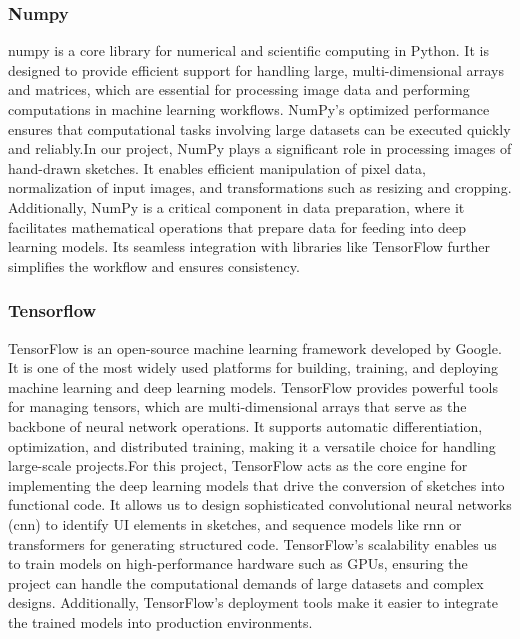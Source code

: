 \subsubsection{Numpy}
\gls{numpy} is a core library for numerical and scientific computing in Python. It is designed to provide efficient support for handling large, multi-dimensional arrays and matrices, which are essential for processing image data and performing computations in machine learning workflows. NumPy's optimized performance ensures that computational tasks involving large datasets can be executed quickly and reliably.In our project, NumPy plays a significant role in processing images of hand-drawn sketches. It enables efficient manipulation of pixel data, normalization of input images, and transformations such as resizing and cropping. Additionally, NumPy is a critical component in data preparation, where it facilitates mathematical operations that prepare data for feeding into deep learning models. Its seamless integration with libraries like TensorFlow further simplifies the workflow and ensures consistency.
\subsubsection{Tensorflow}
TensorFlow is an open-source machine learning framework developed by Google. It is one of the most widely used platforms for building, training, and deploying machine learning and deep learning models. TensorFlow provides powerful tools for managing tensors, which are multi-dimensional arrays that serve as the backbone of neural network operations. It supports automatic differentiation, optimization, and distributed training, making it a versatile choice for handling large-scale projects.For this project, TensorFlow acts as the core engine for implementing the deep learning models that drive the conversion of sketches into functional code. It allows us to design sophisticated convolutional neural networks (\gls{cnn}) to identify UI elements in sketches, and sequence models like \gls{rnn} or transformers for generating structured code. TensorFlow's scalability enables us to train models on high-performance hardware such as GPUs, ensuring the project can handle the computational demands of large datasets and complex designs. Additionally, TensorFlow's deployment tools make it easier to integrate the trained models into production environments.
